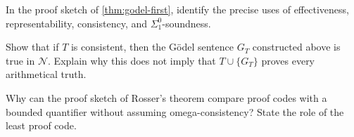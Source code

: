 \begin{exercise}
\label{ex:first-incompleteness-01}
In the proof sketch of \cref{thm:godel-first}, identify the precise uses of
effectiveness, representability, consistency, and \(\Sigma^0_1\)-soundness.
\end{exercise}

\begin{exercise}
\label{ex:first-incompleteness-02}
Show that if \(T\) is consistent, then the G\"odel sentence \(G_T\) constructed
above is true in \(\mathcal N\).  Explain why this does not imply that
\(T\cup\{G_T\}\) proves every arithmetical truth.
\end{exercise}

\begin{exercise}
\label{ex:first-incompleteness-03}
Why can the proof sketch of Rosser's theorem compare proof codes with a
bounded
quantifier without assuming omega-consistency?  State the role of the least
proof code.
\end{exercise}

